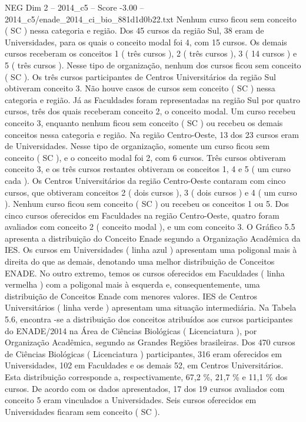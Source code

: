 \begin{textsample}{NEG Dim 2 – 2014\_c5 – Score -3.00 – 2014\_c5/enade\_2014\_ci\_bio\_881d1d0b22.txt}
Nenhum curso ficou sem conceito ( SC ) nessa categoria e região.
Dos 45 cursos da região Sul, 38 eram de Universidades, para os quais o conceito modal foi 4, com 15 cursos.
Os demais cursos receberam os conceitos 1 ( três cursos ), 2 ( três cursos ), 3 ( 14 cursos ) e 5 ( três cursos ).
Nesse tipo de organização, nenhum dos cursos ficou sem conceito ( SC ).
Os três cursos participantes de Centros Universitários da região Sul obtiveram conceito 3.
Não houve casos de cursos sem conceito ( SC ) nessa categoria e região.
Já as Faculdades foram representadas na região Sul por quatro cursos, três dos quais receberam conceito 2, o conceito modal.
Um curso recebeu conceito 3, enquanto nenhum ficou sem conceito ( SC ) ou recebeu os demais conceitos nessa categoria e região.
Na região Centro-Oeste, 13 dos 23 cursos eram de Universidades.
Nesse tipo de organização, somente um curso ficou sem conceito ( SC ), e o conceito modal foi 2, com 6 cursos.
Três cursos obtiveram conceito 3, e os três cursos restantes obtiveram os conceitos 1, 4 e 5 ( um curso cada ).
Os Centros Universitários da região Centro-Oeste contaram com cinco cursos, que obtiveram conceitos 2 ( dois cursos ), 3 ( dois cursos ) e 4 ( um curso ).
Nenhum curso ficou sem conceito ( SC ) ou recebeu os conceitos 1 ou 5.
Dos cinco cursos oferecidos em Faculdades na região Centro-Oeste, quatro foram avaliados com conceito 2 ( conceito modal ), e um com conceito 3.
O Gráfico 5.5 apresenta a distribuição do Conceito Enade segundo a Organização Acadêmica da IES.
Os cursos em Universidades ( linha azul ) apresentam uma poligonal mais à direita do que as demais, denotando uma melhor distribuição de Conceitos ENADE.
No outro extremo, temos os cursos oferecidos em Faculdades ( linha vermelha ) com a poligonal mais à esquerda e, consequentemente, uma distribuição de Conceitos Enade com menores valores.
IES de Centros Universitários ( linha verde ) apresentam uma situação intermediária.
Na Tabela 5.6, encontra -se a distribuição dos conceitos atribuídos aos cursos participantes do ENADE/2014 na Área de Ciências Biológicas ( Licenciatura ), por Organização Acadêmica, segundo as Grandes Regiões brasileiras.
Dos 470 cursos de Ciências Biológicas ( Licenciatura ) participantes, 316 eram oferecidos em Universidades, 102 em Faculdades e os demais 52, em Centros Universitários.
Esta distribuição corresponde a, respectivamente, 67,2 \%, 21,7 \% e 11,1 \% dos cursos.
De acordo com os dados apresentados, 17 dos 19 cursos avaliados com conceito 5 eram vinculados a Universidades.
Seis cursos oferecidos em Universidades ficaram sem conceito ( SC ).

\end{textsample}
